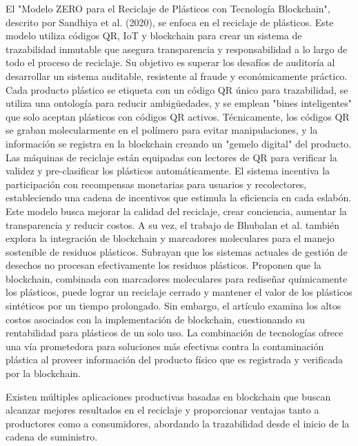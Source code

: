 El "Modelo ZERO para el Reciclaje de Plásticos con Tecnología Blockchain", descrito por Sandhiya et al. (2020), se enfoca en el reciclaje de plásticos. Este modelo utiliza códigos QR, IoT y blockchain para crear un sistema de trazabilidad inmutable que asegura transparencia y responsabilidad a lo largo de todo el proceso de reciclaje. Su objetivo es superar los desafíos de auditoría al desarrollar un sistema auditable, resistente al fraude y económicamente práctico. Cada producto plástico se etiqueta con un código QR único para trazabilidad, se utiliza una ontología para reducir ambigüedades, y se emplean "bines inteligentes" que solo aceptan plásticos con códigos QR activos. Técnicamente, los códigos QR se graban molecularmente en el polímero para evitar manipulaciones, y la información se registra en la blockchain creando un "gemelo digital" del producto. Las máquinas de reciclaje están equipadas con lectores de QR para verificar la validez y pre-clasificar los plásticos automáticamente. El sistema incentiva la participación con recompensas monetarias para usuarios y recolectores, estableciendo una cadena de incentivos que estimula la eficiencia en cada eslabón. Este modelo busca mejorar la calidad del reciclaje, crear conciencia, aumentar la transparencia y reducir costos. A su vez, el trabajo de Bhubalan et al. también explora la integración de blockchain y marcadores moleculares para el manejo sostenible de residuos plásticos. Subrayan que los sistemas actuales de gestión de desechos no procesan efectivamente los residuos plásticos. Proponen que la blockchain, combinada con marcadores moleculares para rediseñar químicamente los plásticos, puede lograr un reciclaje cerrado y mantener el valor de los plásticos sintéticos por un tiempo prolongado. Sin embargo, el artículo examina los altos costos asociados con la implementación de blockchain, cuestionando su rentabilidad para plásticos de un solo uso. La combinación de tecnologías ofrece una vía prometedora para soluciones más efectivas contra la contaminación plástica al proveer información del producto físico que es registrada y verificada por la blockchain.

Existen múltiples aplicaciones productivas basadas en blockchain que buscan alcanzar mejores resultados en el reciclaje y proporcionar ventajas tanto a productores como a consumidores, abordando la trazabilidad desde el inicio de la cadena de suministro.

